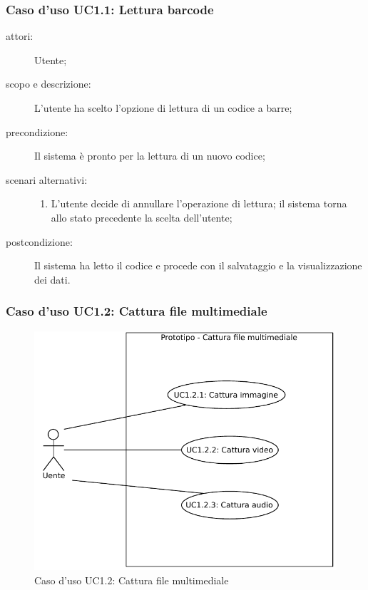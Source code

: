 \subsubsection{Caso d'uso UC1.1: Lettura barcode}
\begin{description}
\item[attori:] Utente;
\item[scopo e descrizione:] L'utente ha scelto l'opzione di lettura di un codice a barre;
\item[precondizione:] Il sistema è pronto per la lettura di un nuovo codice;
\item[scenari alternativi:] \hfill 
	\begin{enumerate}
	\item L'utente decide di annullare l'operazione di lettura; il sistema torna allo stato precedente la scelta dell'utente;
	\end{enumerate}
\item[postcondizione:] Il sistema ha letto il codice e procede con il salvataggio e la visualizzazione dei dati.
\end{description}

\subsubsection{Caso d'uso UC1.2: Cattura file multimediale}
\begin{figure}[htb]
\centering
\includegraphics[scale=0.6]{gfx/useCase/UC1-2_Cattura_file_multimediale.pdf}
\caption{Caso d'uso UC1.2: Cattura file multimediale}
\label{fig:UC1.2}
\end{figure}


